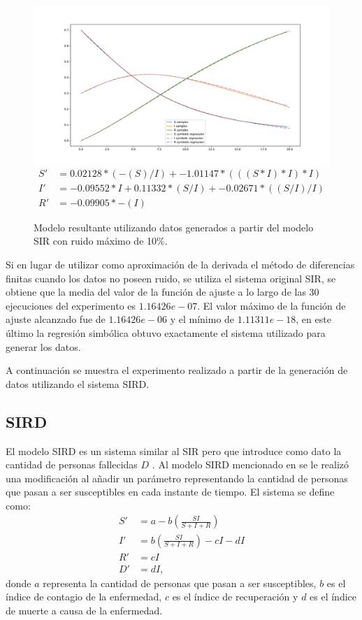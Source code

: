 \begin{figure}[h]
    \centering
    \includegraphics[width=\textwidth]{"figures/final_plot_SIR_0.1.pdf"}
    \begin{align*}
        S' & =  0.02128 * (-(S) / I) + -1.01147 * (((S * I) * I) * I)      \\
        I' & = -0.09552 * I + 0.11332 * (S / I) + -0.02671 * ((S / I) / I) \\
        R' & = -0.09905 * -(I)
    \end{align*}
    \caption{Modelo resultante utilizando datos generados a partir del modelo SIR con ruido máximo de 10\%.}
    \label{fig:final_plot_SIR_0.1}
\end{figure}

Si en lugar de utilizar como aproximación de la derivada el método de diferencias finitas cuando los datos no poseen ruido, se utiliza el sistema original SIR, se obtiene que la media del valor de la función de ajuste a lo largo de las 30 ejecuciones del experimento es $1.16426e-07$. El valor máximo de la función de ajuste alcanzado fue de $1.16426e-06$ y el mínimo de $1.11311e-18$, en este último la regresión simbólica obtuvo exactamente el sistema utilizado para generar los datos.

A continuación se muestra el experimento realizado a partir de la generación de datos utilizando el sistema SIRD.

\subsection{SIRD}

El modelo SIRD es un sistema similar al SIR pero que introduce como dato la cantidad de personas fallecidas $D$ \cite{bailey1975mathematical}. Al modelo SIRD mencionado en \cite{bailey1975mathematical} se le realizó una modificación al añadir un parámetro representando la cantidad de personas que pasan a ser susceptibles en cada instante de tiempo. El sistema se define como:
\begin{align*}
    S' & = a - b (\frac{S I}{S + I + R})         \\
    I' & = b (\frac{S I}{S + I + R}) - c I - d I \\
    R' & = c I                                   \\
    D' & = d I,
\end{align*}
donde $a$ representa la cantidad de personas que pasan a ser susceptibles, $b$ es el índice de contagio de la enfermedad, $c$ es el índice de recuperación y $d$ es el índice de muerte a causa de la enfermedad.

